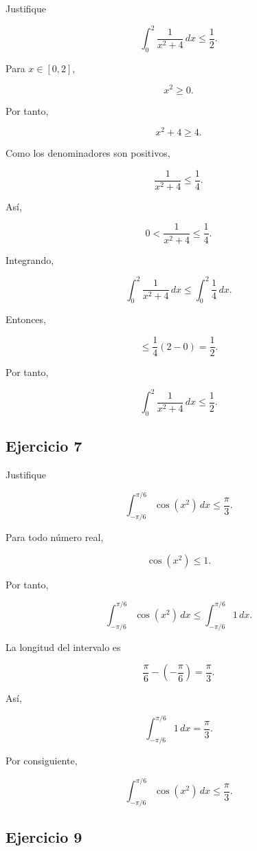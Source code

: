 \documentclass[12pt]{article}
\begin{document}
Justifique

\[
\int_0^2\frac{1}{x^2+4}\,dx
\leq
\frac12.
\]

Para \(x\in[0,2]\),

\[
x^2\geq0.
\]

Por tanto,

\[
x^2+4\geq4.
\]

Como los denominadores son positivos,

\[
\frac1{x^2+4}
\leq
\frac14.
\]

Así,

\[
0<
\frac1{x^2+4}
\leq
\frac14.
\]

Integrando,

\[
\int_0^2\frac1{x^2+4}\,dx
\leq
\int_0^2\frac14\,dx.
\]

Entonces,

\[
\leq
\frac14(2-0)
=
\frac12.
\]

Por tanto,

\[
\boxed{
\int_0^2\frac{1}{x^2+4}\,dx
\leq\frac12
}.
\]

\subsection*{Ejercicio 7}

Justifique

\[
\int_{-\pi/6}^{\pi/6}\cos(x^2)\,dx
\leq
\frac{\pi}{3}.
\]

Para todo número real,

\[
\cos(x^2)\leq1.
\]

Por tanto,

\[
\int_{-\pi/6}^{\pi/6}\cos(x^2)\,dx
\leq
\int_{-\pi/6}^{\pi/6}1\,dx.
\]

La longitud del intervalo es

\[
\frac{\pi}{6}-\left(-\frac{\pi}{6}\right)
=
\frac{\pi}{3}.
\]

Así,

\[
\int_{-\pi/6}^{\pi/6}1\,dx
=
\frac{\pi}{3}.
\]

Por consiguiente,

\[
\boxed{
\int_{-\pi/6}^{\pi/6}\cos(x^2)\,dx
\leq
\frac{\pi}{3}
}.
\]

\subsection*{Ejercicio 9}
\end{document}
